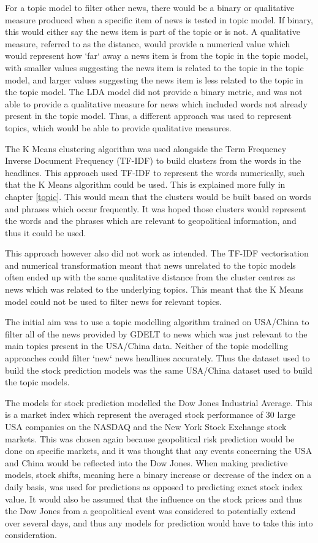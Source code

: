 For a topic model to filter other news, there would be a binary or qualitative measure produced when a specific item of news is tested in topic model. If binary, this would either say the news item is part of the topic or is not. A qualitative measure, referred to as the distance, would provide a numerical value which would represent how `far` away a news item is from the topic in the topic model, with smaller values suggesting the news item is related to the topic in the topic model, and larger values suggesting the news item is less related to the topic in the topic model. The LDA model did not provide a binary metric, and was not able to provide a qualitative measure for news which included words not already present in the topic model. Thus, a different approach was used to represent topics, which would be able to provide qualitative measures.  

The K Means clustering algorithm was used alongside the Term Frequency Inverse Document Frequency (TF-IDF) to build clusters from the words in the headlines. This approach used TF-IDF to represent the words numerically, such that the K Means algorithm could be used. This is explained more fully in chapter \ref{topic}. This would mean that the clusters would be built based on words and phrases which occur frequently. It was hoped those clusters would represent the words and the phrases which are relevant to geopolitical information, and thus it could be used. 

This approach however also did not work as intended. The TF-IDF vectorisation and numerical transformation meant that news unrelated to the topic models often ended up with the same qualitative distance from the cluster centres as news which was related to the underlying topics. This meant that the K Means model could not be used to filter news for relevant topics. 

The initial aim was to use a topic modelling algorithm trained on USA/China to filter all of the news provided by GDELT to news which was just relevant to the main topics present in the USA/China data. Neither of the topic modelling approaches could filter `new` news headlines accurately. Thus the dataset used to build the stock prediction models was the same USA/China dataset used to build the topic models. 

The models for stock prediction modelled the Dow Jones Industrial Average. This is a market index which represent the averaged stock performance of 30 large USA companies on the NASDAQ and the New York Stock Exchange stock markets. This was chosen again because geopolitical risk prediction would be done on specific markets, and it was thought that any events concerning the USA and China would be reflected into the Dow Jones. When making predictive models, stock shifts, meaning here a binary increase or decrease of the index on a daily basis, was used for predictions as opposed to predicting exact stock index value. It would also be assumed that the influence on the stock prices and thus the Dow Jones from a geopolitical event was considered to potentially extend over several days, and thus any models for prediction would have to take this into consideration.

